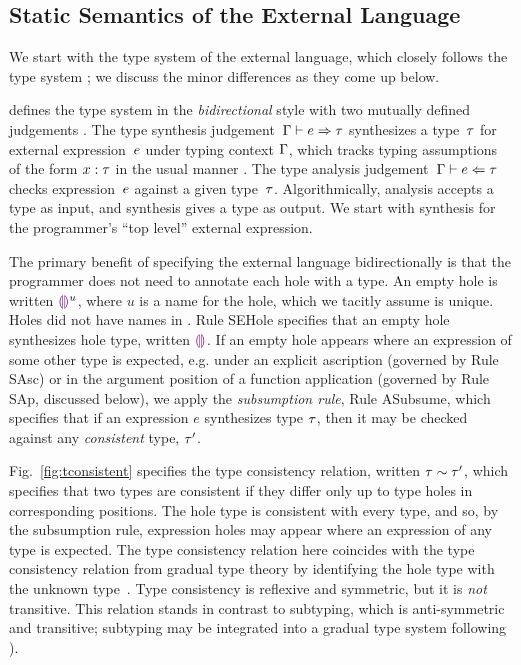 \subsection{Static Semantics of the External Language}
\label{sec:external-statics}


We start with the type system of the \HazelnutLive
external language, which closely follows the \Hazelnut type
system \cite{popl-paper}; we discuss the minor differences as they come up below.

 defines the type system in the \emph{bidirectional} style 
%
with two mutually defined judgements \cite{Pierce:2000ve,bidi-tutorial,DBLP:conf/icfp/DunfieldK13,Chlipala:2005da}. The type synthesis
judgement~$\Gamma \vdash e \Rightarrow \tau$ synthesizes a type~$\tau$
for external expression~$e$ under typing context $\Gamma$, which tracks typing
assumptions of the form $x : \tau$ in the usual
manner \cite{pfpl,tapl}.
%
The type analysis judgement~$\Gamma \vdash e \Leftarrow \tau$ checks
expression~$e$ against a given type~$\tau$.
%
Algorithmically, analysis accepts a type as input, and synthesis gives
a type as output.
%
We start with synthesis for the programmer's ``top level'' external
expression.


The primary benefit of specifying the \HazelnutLive external language 
bidirectionally is that the programmer does not need to annotate each hole with a type. 
%
An empty hole is
written $\textcolor{violet}{\llparenthesis}\textcolor{violet}{\rrparenthesis}^{u}$, where $u$ is a name for the hole, which we tacitly assume is unique. 
Holes did not have names in \Hazelnut. 
%
Rule {SEHole} specifies that an empty hole synthesizes hole type, written $\textcolor{violet}{\llparenthesis}\textcolor{violet}{\rrparenthesis}$.
%
If an empty hole appears where an expression of some other type is
expected, e.g. under an explicit ascription (governed by Rule {SAsc})
or in the argument position of a function application (governed by
Rule {SAp}, discussed below), we apply the \emph{subsumption rule},
Rule {ASubsume}, which specifies that if an expression $e$ synthesizes
type $\tau$, then it may be checked against any \emph{consistent}
type, $\tau'$.



Fig.~\ref{fig:tconsistent} specifies the type consistency relation, written $\tau \sim \tau'$, which specifies that two types are consistent if they differ only up to type holes in corresponding positions.
%
The hole type is consistent with every type, and so, by the subsumption rule, expression holes may appear where an expression of any type is expected. The type consistency relation here coincides with the type consistency relation from gradual type theory by identifying the hole type with the unknown type~\cite{Siek06a}.
%
Type consistency is reflexive and symmetric, but it is \emph{not} transitive.
%
This relation stands in contrast to subtyping, which is anti-symmetric and transitive; subtyping may be integrated into a gradual type system following \citet{Siek:2007qy}).

